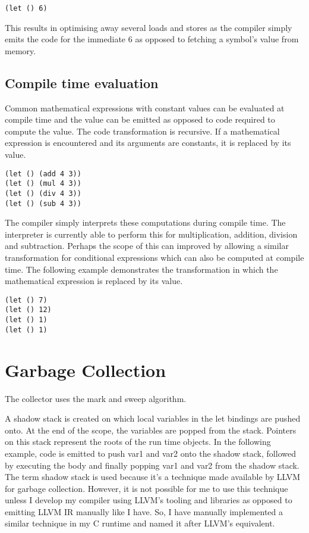 \documentclass{article}
\begin{document}
\begin{verbatim}
(let () 6)
\end{verbatim}

This results in optimising away several loads and stores as the compiler simply emits the code for the immediate 6 as opposed to fetching a symbol's value from memory.

\subsection{Compile time evaluation}

Common mathematical expressions with constant values can be evaluated at compile time and the value can be emitted as opposed to code required to compute the value. The code transformation is recursive. If a mathematical expression is encountered and its arguments are constants, it is replaced by its value.

\begin{verbatim}
(let () (add 4 3))
(let () (mul 4 3))
(let () (div 4 3))
(let () (sub 4 3))
\end{verbatim}

The compiler simply interprets these computations during compile time. The interpreter is currently able to perform this for multiplication, addition, division and subtraction. Perhaps the scope of this can improved by allowing a similar transformation for conditional expressions which can also be computed at compile time. The following example demonstrates the transformation in which the mathematical expression is replaced by its value.

\begin{verbatim}
(let () 7)
(let () 12)
(let () 1)
(let () 1)
\end{verbatim}

\section{Garbage Collection}

The collector uses the mark and sweep algorithm.

A shadow stack is created on which local variables in the let bindings are pushed onto. At the end of the scope, the variables are popped from the stack. Pointers on this stack represent the roots of the run time objects. In the following example, code is emitted to push var1 and var2 onto the shadow stack, followed by executing the body and finally popping var1 and var2 from the shadow stack. The term shadow stack is used because it's a technique made available by LLVM for garbage collection. However, it is not possible for me to use this technique unless I develop my compiler using LLVM's tooling and libraries as opposed to emitting LLVM IR manually like I have. So, I have manually implemented a similar technique in my C runtime and named it after LLVM's equivalent. 
\end{document}
